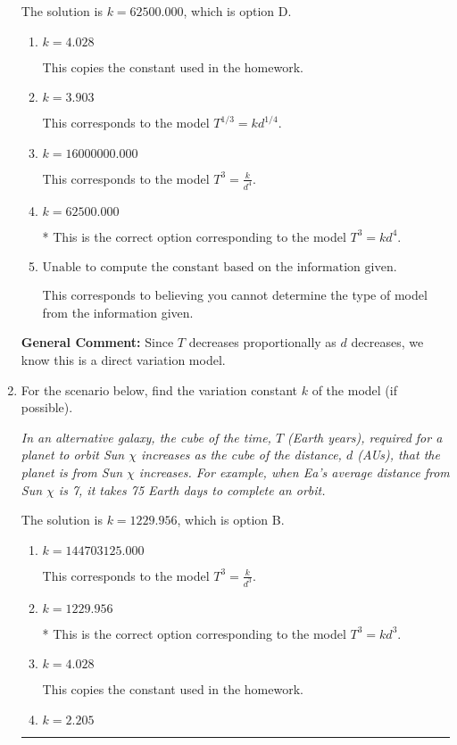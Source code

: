 \documentclass{extbook}[14pt]
\newcommand{\litem}[1]{\item #1

\rule{\textwidth}{0.4pt}}
\begin{document}
\begin{enumerate}
{The solution is \( k = 62500.000 \), which is option D.\begin{enumerate}[label=\Alph*.]
\item \( k = 4.028 \)

This copies the constant used in the homework.
\item \( k = 3.903 \)

This corresponds to the model $T^{1/3} = k d^{1/4}$.
\item \( k = 16000000.000 \)

This corresponds to the model $T^{3} = \frac{k}{d^{4}}$.
\item \( k = 62500.000 \)

* This is the correct option corresponding to the model $T^{3} = k d^{4}$.
\item \( \text{Unable to compute the constant based on the information given.} \)

This corresponds to believing you cannot determine the type of model from the information given.
\end{enumerate}

\textbf{General Comment:} Since $T$ decreases proportionally as $d$ decreases, we know this is a direct variation model.
}
\litem{
For the scenario below, find the variation constant $k$ of the model (if possible).

\begin{center}
    \textit{ In an alternative galaxy, the cube of the time, $T$ (Earth years), required for a planet to orbit Sun $\chi$ increases as the cube of the distance, $d$ (AUs), that the planet is from Sun $\chi$ increases. For example, when Ea's average distance from Sun $\chi$ is 7, it takes 75 Earth days to complete an orbit. }
\end{center}


The solution is \( k = 1229.956 \), which is option B.\begin{enumerate}[label=\Alph*.]
\item \( k = 144703125.000 \)

This corresponds to the model $T^{3} = \frac{k}{d^{3}}$.
\item \( k = 1229.956 \)

* This is the correct option corresponding to the model $T^{3} = k d^{3}$.
\item \( k = 4.028 \)

This copies the constant used in the homework.
\item \( k = 2.205 \)


\end{enumerate}}
\end{enumerate}
\end{document}

